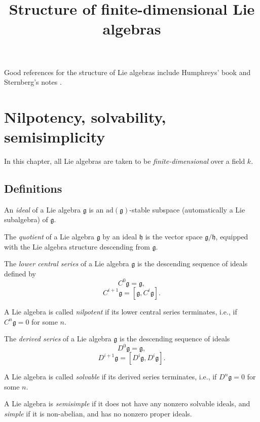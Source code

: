 

%


\title{Structure of finite-dimensional Lie algebras}


\maketitle

\label{section-phantom}

\tableofcontents

Good references for the structure of Lie algebras include Humphreys' book \cite{Humphreys-Lie} and Sternberg's notes \cite{Sternberg}.

\section{Nilpotency, solvability, semisimplicity}
\label{section-nilpotent-solvable}


In this chapter, all Lie algebras are taken to be \emph{finite-dimensional} over a field $k$.

\subsection{Definitions}
\label{subsection-definitions-nilpotent-solvable}

\begin{definition}
 \label{definition-ideal}
An {\it ideal} of a Lie algebra $\mathfrak g$ is an $\text{ad}(\mathfrak g)$-stable subspace (automatically a Lie subalgebra) of $\mathfrak g$.

The {\it quotient} of a Lie algebra $\mathfrak g$ by an ideal $\mathfrak h$ is the vector space $\mathfrak g/\mathfrak h$, equipped with the Lie algebra structure descending from $\mathfrak g$.
\end{definition}



\begin{definition}
 \label{definition-nilpotent-solvable-semisimple}
The {\it lower central series} of a Lie algebra $\mathfrak g$ is the descending sequence of ideals defined by
$$ C^0\mathfrak g = \mathfrak g,$$
$$ C^{i+1}\mathfrak g = [\mathfrak g, C^i\mathfrak g].$$
 
 
A Lie algebra is called {\it nilpotent} if its lower central series terminates, i.e., if $C^n\mathfrak g=0$ for some $n$.


The {\it derived series} of a Lie algebra $\mathfrak g$ is the descending sequence of ideals
$$ D^0\mathfrak g = \mathfrak g,$$
$$ D^{i+1}\mathfrak g = [D^i\mathfrak g, D^i\mathfrak g].$$

A Lie algebra is called {\it solvable} if its derived series terminates, i.e., if $D^n\mathfrak g=0$ for some $n$.

A Lie algebra is {\it semisimple} if it does not have any nonzero solvable ideals, and {\it simple} if it is non-abelian, and has no nonzero proper ideals.
\end{definition}

